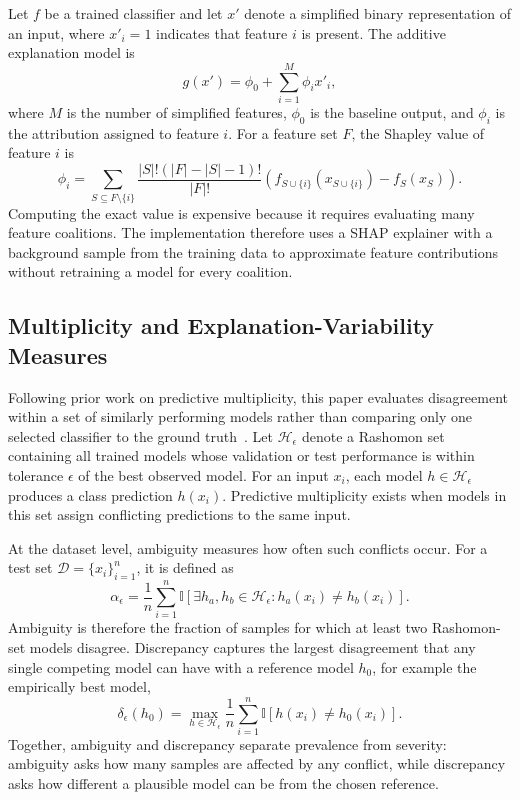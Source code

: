 Let $f$ be a trained classifier and let $x'$ denote a simplified binary representation of an input, where $x'_i=1$ indicates that feature $i$ is present. The additive explanation model is
\begin{equation*}
    g(x') = \phi_0 + \sum_{i=1}^{M} \phi_i x'_i ,
\end{equation*}
where $M$ is the number of simplified features, $\phi_0$ is the baseline output, and $\phi_i$ is the attribution assigned to feature $i$. For a feature set $F$, the Shapley value of feature $i$ is
\begin{equation*}
    \phi_i =
    \sum_{S \subseteq F \setminus \{i\}}
    \frac{|S|!(|F|-|S|-1)!}{|F|!}
    \left(f_{S \cup \{i\}}(x_{S \cup \{i\}}) - f_S(x_S)\right).
\end{equation*}
Computing the exact value is expensive because it requires evaluating many feature coalitions. The implementation therefore uses a \gls{SHAP} explainer with a background sample from the training data to approximate feature contributions without retraining a model for every coalition.

\subsection{Multiplicity and Explanation-Variability Measures}

Following prior work on predictive multiplicity, this paper evaluates disagreement within a set of similarly performing models rather than comparing only one selected classifier to the ground truth~\cite{marx2020predictive,hsu2022rashomon}. Let $\mathcal{H}_{\epsilon}$ denote a Rashomon set containing all trained models whose validation or test performance is within tolerance $\epsilon$ of the best observed model. For an input $x_i$, each model $h \in \mathcal{H}_{\epsilon}$ produces a class prediction $h(x_i)$. Predictive multiplicity exists when models in this set assign conflicting predictions to the same input.

At the dataset level, ambiguity measures how often such conflicts occur. For a test set $\mathcal{D}=\{x_i\}_{i=1}^{n}$, it is defined as
\begin{equation*}
    \alpha_{\epsilon} =
    \frac{1}{n}
    \sum_{i=1}^{n}
    \mathbb{I}\left[
        \exists h_a,h_b \in \mathcal{H}_{\epsilon}: h_a(x_i) \neq h_b(x_i)
    \right].
\end{equation*}
Ambiguity is therefore the fraction of samples for which at least two Rashomon-set models disagree. Discrepancy captures the largest disagreement that any single competing model can have with a reference model $h_0$, for example the empirically best model,
\begin{equation*}
    \delta_{\epsilon}(h_0) =
    \max_{h \in \mathcal{H}_{\epsilon}}
    \frac{1}{n}
    \sum_{i=1}^{n}
    \mathbb{I}\left[h(x_i) \neq h_0(x_i)\right].
\end{equation*}
Together, ambiguity and discrepancy separate prevalence from severity: ambiguity asks how many samples are affected by any conflict, while discrepancy asks how different a plausible model can be from the chosen reference.

